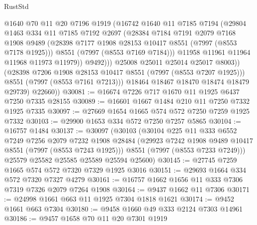\begin{lexlean}{RustStd}
\begin{coremodule}
                      @1640
                      @70
                      @11
                      @20
                      @7196
                      @1919
                      (@16742
                        @1640
                        @11
                        @7185
                        @7194
                        (@29804
                          @1463
                          @334
                          @11
                          @7185
                          @7192
                          @2697
                          (@28384
                            @7184
                            @7191
                            @2079
                            @7168
                            @1908
                            @9489
                            (@28398 @7177 @1908 @28153 @10417 @8551 (@7997 (@8553 @7178 @1925)))
                            @8551
                            (@7997 (@8553 @7169 @7184)))
                          @11958
                          @11961
                          @11964
                          @11968
                          @11973
                          @11979))
                      @9492)))
                @25008
                @25011
                @25014
                @25017
                @8003))
            (@28398 @7206 @1908 @28153 @10417 @8551 (@7997 (@8553 @7207 @1925)))
            @8551
            (@7997 (@8553 @7161 @7213)))
          @18464
          @18467
          @18470
          @18474
          @18479
          @29739)
        @22660))
@30081 := @16674 @7226 @717 @1670 @11 @1925 @6437 @7250 @7335 @28155
@30089 := @16601 @1667 @1484 @210 @11 @7250 @7332 @1925 @7335
@30097 := @27669 @1654 @1665 @574 @572 @7250 @7259 @1925 @7332
@30103 := @29900 @1653 @334 @572 @7250 @7257 @5865
@30104 := @16757 @1484
@30137 := @30097
    (@30103
      (@30104
        @225
        @11
        @333
        @6552
        @7249
        @7256
        @2079
        @7232
        @1908
        @28484
        (@29923 @7242 @1908 @9489 @10417 @8551 (@7997 (@8553 @7243 @1925)))
        @8551
        (@7997 (@8553 @7233 @7249)))
      @25579
      @25582
      @25585
      @25589
      @25594
      @25600)
@30145 := @27745 @7259 @1665 @574 @572 @7320 @7329 @1925 @3016
@30151 := @29693 @1664 @334 @572 @7320 @7327 @4279
@30161 := @16757 @1662 @1656 @11 @333 @7306 @7319 @7326 @2079 @7264 @1908
@30164 := @9437 @1662 @11 @7306
@30171 := @24998 @1661 @663 @11 @1925 @7304 @1818 @1621
@30174 := @9452 @1661 @663 @7304
@30180 := @9458 @1660 @49 @333 @2124 @7303 @14961
@30186 := @9457 @1658 @70 @11 @20 @7301 @1919

\end{coremodule}
\end{lexlean}
